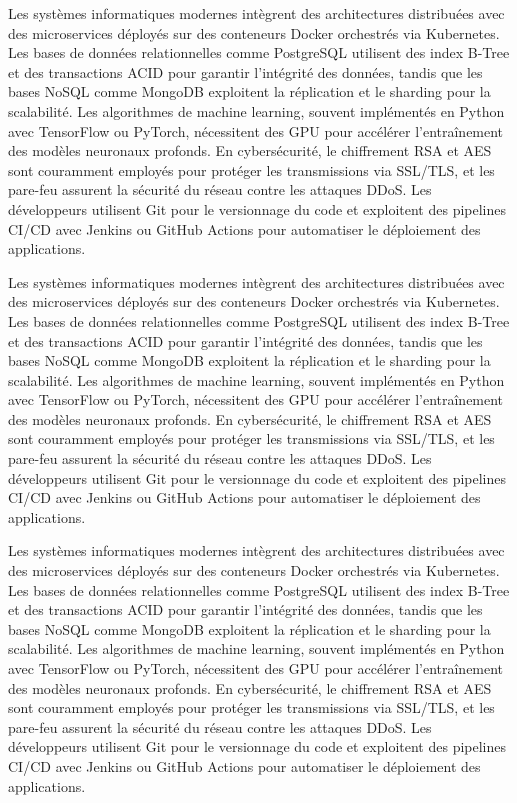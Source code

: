 Les systèmes informatiques modernes intègrent des architectures distribuées avec des microservices déployés sur des conteneurs Docker orchestrés via Kubernetes. Les bases de données relationnelles comme PostgreSQL utilisent des index B-Tree et des transactions ACID pour garantir l'intégrité des données, tandis que les bases NoSQL comme MongoDB exploitent la réplication et le sharding pour la scalabilité. Les algorithmes de machine learning, souvent implémentés en Python avec TensorFlow ou PyTorch, nécessitent des GPU pour accélérer l'entraînement des modèles neuronaux profonds. En cybersécurité, le chiffrement RSA et AES sont couramment employés pour protéger les transmissions via SSL/TLS, et les pare-feu assurent la sécurité du réseau contre les attaques DDoS. Les développeurs utilisent Git pour le versionnage du code et exploitent des pipelines CI/CD avec Jenkins ou GitHub Actions pour automatiser le déploiement des applications.

Les systèmes informatiques modernes intègrent des architectures distribuées avec des microservices déployés sur des conteneurs Docker orchestrés via Kubernetes. Les bases de données relationnelles comme PostgreSQL utilisent des index B-Tree et des transactions ACID pour garantir l'intégrité des données, tandis que les bases NoSQL comme MongoDB exploitent la réplication et le sharding pour la scalabilité. Les algorithmes de machine learning, souvent implémentés en Python avec TensorFlow ou PyTorch, nécessitent des GPU pour accélérer l'entraînement des modèles neuronaux profonds. En cybersécurité, le chiffrement RSA et AES sont couramment employés pour protéger les transmissions via SSL/TLS, et les pare-feu assurent la sécurité du réseau contre les attaques DDoS. Les développeurs utilisent Git pour le versionnage du code et exploitent des pipelines CI/CD avec Jenkins ou GitHub Actions pour automatiser le déploiement des applications.

Les systèmes informatiques modernes intègrent des architectures distribuées avec des microservices déployés sur des conteneurs Docker orchestrés via Kubernetes. Les bases de données relationnelles comme PostgreSQL utilisent des index B-Tree et des transactions ACID pour garantir l'intégrité des données, tandis que les bases NoSQL comme MongoDB exploitent la réplication et le sharding pour la scalabilité. Les algorithmes de machine learning, souvent implémentés en Python avec TensorFlow ou PyTorch, nécessitent des GPU pour accélérer l'entraînement des modèles neuronaux profonds. En cybersécurité, le chiffrement RSA et AES sont couramment employés pour protéger les transmissions via SSL/TLS, et les pare-feu assurent la sécurité du réseau contre les attaques DDoS. Les développeurs utilisent Git pour le versionnage du code et exploitent des pipelines CI/CD avec Jenkins ou GitHub Actions pour automatiser le déploiement des applications.

